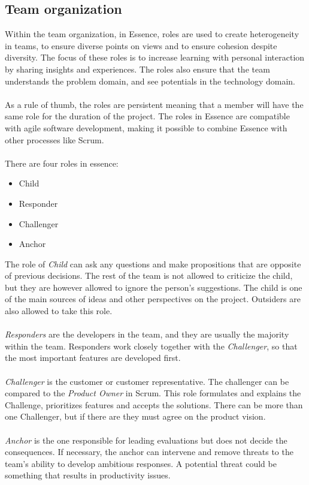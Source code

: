 \subsection{Team organization}
\label{sec:team-organization}
Within the team organization, in Essence, roles are used to create heterogeneity in teams, to ensure diverse points on views and to ensure cohesion despite diversity.
The focus of these roles is to increase learning with personal interaction by sharing insights and experiences.
The roles also ensure that the team understands the problem domain, and see potentials in the technology domain.
\\\\
As a rule of thumb, the roles are persistent meaning that a member will have the same role for the duration of the project.
The roles in Essence are compatible with agile software development, making it possible to combine Essence with other processes like Scrum.
\\\\
There are four roles in essence:
\begin{itemize}
    \item Child
    \item Responder
    \item Challenger
    \item Anchor
\end{itemize}
The role of \textit{Child} can ask any questions and make propositions that are opposite of previous decisions.
The rest of the team is not allowed to criticize the child, but they are however allowed to ignore the person's suggestions.
The child is one of the main sources of ideas and other perspectives on the project.
Outsiders are also allowed to take this role.
\\\\
\textit{Responders} are the developers in the team, and they are usually the majority within the team.
Responders work closely together with the \textit{Challenger}, so that the most important features are developed first.
\\\\
\textit{Challenger} is the customer or customer representative. 
The challenger can be compared to the \textit{Product Owner} in Scrum.
This role formulates and explains the Challenge, prioritizes features and accepts the solutions.
There can be more than one Challenger, but if there are they must agree on the product vision.
\\\\
\textit{Anchor} is the one responsible for leading evaluations but does not decide the consequences.
If necessary, the anchor can intervene and remove threats to the team's ability to develop ambitious responses. 
A potential threat could be something that results in productivity issues.
